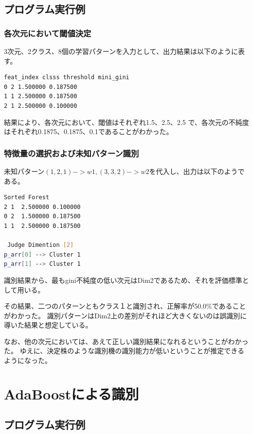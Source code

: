 \documentclass[ %
  uplatex,%
  papersize%
]{jsarticle}
\begin{document}
\subsection{プログラム実行例}
\subsubsection{各次元において閾値決定}
3次元、2クラス、8個の学習パターンを入力として、出力結果は以下のように表す。
\newpage
\begin{lstlisting}[language=bash,caption=Recognition]
feat_index clsss threshold mini_gini
0 2 1.500000 0.187500
1 1 2.500000 0.187500
2 1 2.500000 0.100000
\end{lstlisting}

結果により、各次元において、閾値はそれぞれ1.5、2.5、2.5 で、各次元の不純度はそれぞれ0.1875、0.1875、0.1であることがわかった。

\subsubsection{特徴量の選択および未知パターン識別}
未知パターン$(1, 2, 1) -> w1 ,(3, 3, 2) -> w2$を代入し、出力は以下のようである。

\begin{lstlisting}[language=bash,caption=Recognition]
Sorted Forest
2 1  2.500000 0.100000
0 2  1.500000 0.187500
1 1  2.500000 0.187500

 Judge Dimention [2]
p_arr[0] --> Cluster 1
p_arr[1] --> Cluster 1
\end{lstlisting}

識別結果から、最もgini不純度の低い次元はDim2であるため、それを評価標準として用いる。

その結果、二つのパターンともクラス１と識別され、正解率が50.0\%であることがわかった。
識別パターンはDim2上の差別がそれほど大きくないのは誤識別に導いた結果と想定している。

なお、他の次元においては、あえて正しい識別結果になれるということがわかった。
ゆえに、決定株のような識別機の識別能力が低いということが推定できるようになった。

\section{AdaBoostによる識別}

\subsection{プログラム実行例}
\end{document}
